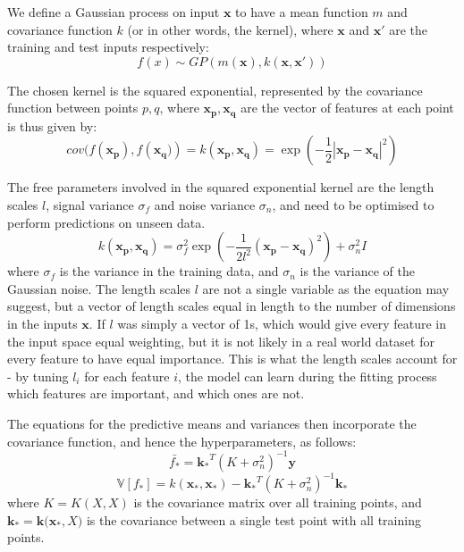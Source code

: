 We define a Gaussian process on input $\mathbf{x}$ to have a mean function $m$ and covariance function $k$ (or in other words, the kernel), where $\mathbf{x}$ and $\mathbf{x'}$ are the training and test inputs respectively:
\begin{equation}
f(x) \sim GP(m(\mathbf{x}), k(\mathbf{x}, \mathbf{x'}))
\end{equation}

The chosen kernel is the squared exponential, represented by the covariance function between points $p, q$, where $\mathbf{x_p, x_q}$ are the vector of features at each point is thus given by:
\begin{equation}\label{eq:simplegpcov}
    cov(f(\mathbf{x_p}), f(\mathbf{x_q)}) = k(\mathbf{x_p, x_q}) = \exp(-\frac{1}{2}|\mathbf{x_p}-\mathbf{x_q}|^2)
\end{equation}

The free parameters involved in the squared exponential kernel are the length scales $l$, signal variance $\sigma_f$ and noise variance $\sigma_n$, and need to be optimised to perform predictions on unseen data.
\begin{equation}\label{eq:fullgpcov}
    k\mathbf{(x_p, x_q)} = \sigma^2_f \exp(-\frac{1}{2l^2} (\mathbf{x_p-x_q})^2) + \sigma^2_nI
\end{equation}
where $\sigma_f$ is the variance in the training data, and $\sigma_n$ is the variance of the Gaussian noise. The length scales $l$ are not a single variable as the equation may suggest, but a vector of length scales equal in length to the number of dimensions in the inputs $\mathbf{x}$. If $l$ was simply a vector of 1s, which would give every feature in the input space equal weighting, but it is not likely in a real world dataset for every feature to have equal importance. This is what the length scales account for - by tuning $l_i$ for each feature $i$, the model can learn during the fitting process which features are important, and which ones are not. 

 The equations for the predictive means and variances then incorporate the covariance function, and hence the hyperparameters, as follows:
\begin{equation}
    \bar{f_*} = \mathbf{k_*}^T(K+\sigma_n^2)^{-1} \mathbf{y}
\end{equation}
\begin{equation}
    \mathbb{V}[f_*] = k(\mathbf{x_*},\mathbf{x_*}) - \mathbf{k_*}^T (K+\sigma^2_n)^{-1}\mathbf{k_*}
\end{equation}
where $K = K(X, X)$ is the covariance matrix over all training points, and $\mathbf{k_*} = \mathbf{k(x_*}, X)$ is the covariance between a single test point with all training points.

